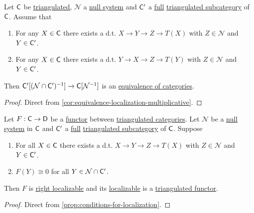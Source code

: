 \documentclass[../../main]{subfiles}
\begin{document}
\begin{proposition}\label{prop:equivalence-localization-null-system}
  Let \(\mathsf{C}\) be \hyperref[def:triangulated-category]{triangulated}, \(\mathcal{N}\) a \hyperref[def:null-system]{null system} and \(\mathsf{C'}\) a \hyperref[def:subcategory]{full} \hyperref[def:triangulated-subcategory]{triangulated subcategory} of \(\mathsf{C}\).
  Assume that
  \begin{enumerate}
    \item For any \(X \in \mathsf{C}\) there exists a d.t. \(X \to Y \to Z \to T(X)\) with \(Z \in \mathcal{N}\) and \(Y \in \mathsf{C'}\).
    \item For any \(X \in \mathsf{C}\) there exists a d.t. \(Y \to X \to Z \to T(Y)\) with \(Z \in \mathcal{N}\) and \(Y \in \mathsf{C'}\).
  \end{enumerate}
  Then \(\mathsf{C'}[(\mathcal{N} \cap \mathsf{C'})^{-1}] \to \mathsf{C}[\mathcal{N}^{-1}]\) is an \hyperref[def:equivalent-categories]{equivalence of categories}.
\end{proposition}
\begin{proof}
  Direct from \autoref{cor:equivalence-localization-multiplicative}.
\end{proof}

\begin{theorem}\label{thm:conditions-localization-null-system}
  Let \(F: \mathsf{C} \to \mathsf{D}\) be a \hyperref[def:functor]{functor} between \hyperref[def:triangulated-category]{triangulated categories}.
  Let \(\mathcal{N}\) be a \hyperref[def:null-system]{null system} in \(\mathsf{C}\) and \(\mathsf{C'}\) a \hyperref[def:subcategory]{full} \hyperref[def:triangulated-subcategory]{triangulated subcategory} of \(\mathsf{C}\).
  Suppose
  \begin{enumerate}
    \item For all \(X \in \mathsf{C}\) there exists a d.t. \(X \to Y \to Z \to T(X)\) with \(Z \in \mathcal{N}\) and \(Y \in \mathsf{C'}\).
    \item \(F(Y) \cong 0\) for all \(Y \in \mathcal{N} \cap \mathsf{C'}\).
  \end{enumerate}
  Then \(F\) is \hyperref[def:localization-functor]{right localizable} and its \hyperref[def:localization-functor]{localizable} is a \hyperref[def:triangulated-functor]{triangulated functor}.
\end{theorem}
\begin{proof}
  Direct from \autoref{prop:conditions-for-localization}.
\end{proof}
\end{document}
